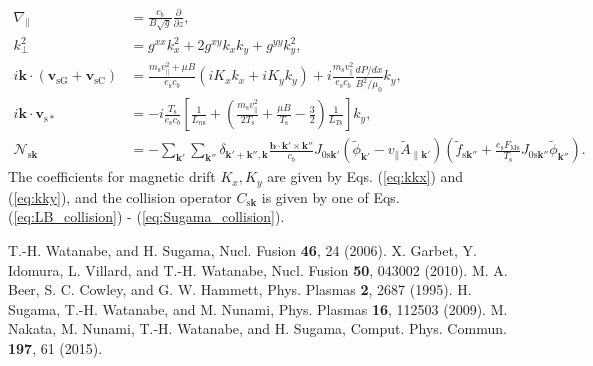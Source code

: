 \begin{align}
  \nabla_\parallel &= \frac{c_b}{B \sqrt{g}} \frac{\partial}{\partial z}, \\
  k_\perp^2 &= g^{xx} k_x^2 + 2 g^{xy} k_x k_y + g^{yy} k_y^2, \\
  i \bm{k} \cdot (\bm{v}_\mathrm{sG} + \bm{v}_\mathrm{sC}) &= \frac{m_\mathrm{s} v_\parallel^2 + \mu B}{e_\mathrm{s} c_b} \left( i K_x k_x + i K_y k_y \right) + i \frac{m_\mathrm{s} v_\parallel^2}{e_\mathrm{s} c_b} \frac{dP/dx}{B^2/\mu_0} k_y, \\
  i \bm{k} \cdot \bm{v}_\mathrm{s*} &= - i \frac{T_\mathrm{s}}{e_\mathrm{s} c_b} \left[ \frac{1}{L_{n\mathrm{s}}} + \left( \frac{m_\mathrm{s} v_\parallel^2}{2T_\mathrm{s}} + \frac{\mu B}{T_\mathrm{s}} - \frac{3}{2} \right) \frac{1}{L_{T\mathrm{s}}} \right] k_y, \\
  \mathcal{N}_{\mathrm{s}\bm{k}} &= - \sum_{\bm{k}'} \sum_{\bm{k}''} \delta_{\bm{k}'+\bm{k}'',\bm{k}}\frac{\bm{b} \cdot \bm{k}' \times \bm{k}''}{c_b} J_{0\mathrm{s}\bm{k}'} \left( \tilde{\phi}_{\bm{k}'} - v_\parallel \tilde{A}_{\parallel\bm{k}'} \right) \left( \tilde{f}_{\mathrm{s}\bm{k}''} + \frac{e_\mathrm{s} F_\mathrm{Ms}}{T_\mathrm{s}} J_{0\mathrm{s}\bm{k}''} \tilde{\phi}_{\bm{k}''} \right).
\end{align}
The coefficients for magnetic drift $K_x, K_y$ are given by Eqs. (\ref{eq:kkx}) and (\ref{eq:kky}), and the collision operator $C_{\mathrm{s}\bm{k}}$ is given by one of Eqs. (\ref{eq:LB_collision}) - (\ref{eq:Sugama_collision}).

\begin{thebibliography}{99}
  T.-H. Watanabe, and H. Sugama,
  Nucl. Fusion {\bf 46}, 24 (2006).
  X. Garbet, Y. Idomura, L. Villard, and T.-H. Watanabe,
  Nucl. Fusion {\bf 50}, 043002 (2010).
  M. A. Beer, S. C. Cowley, and G. W. Hammett,
  Phys. Plasmas {\bf 2}, 2687 (1995).
  H. Sugama, T.-H. Watanabe, and M. Nunami,
  Phys. Plasmas {\bf 16}, 112503 (2009).
  M. Nakata, M. Nunami, T.-H. Watanabe, and H. Sugama,
  Comput. Phys. Commun. {\bf 197}, 61 (2015).
\end{thebibliography}
